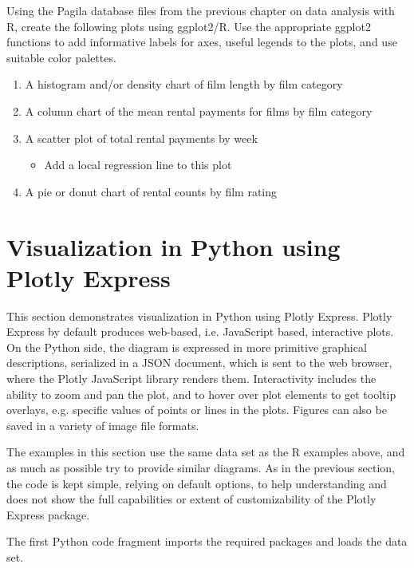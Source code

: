 \begin{exercisebox}
Using the Pagila database files from the previous chapter on data analysis with R, create the following plots using ggplot2/R. Use the appropriate ggplot2 functions to add informative labels for axes, useful legends to the plots, and use suitable color palettes. 

\begin{enumerate}
   \item A histogram and/or density chart of film length by film category
   \item A column chart of the mean rental payments for films by film category
   \item A scatter plot of total rental payments by week
   \begin{itemize}
      \item Add a local regression line to this plot
   \end{itemize}
   \item A pie or donut chart of rental counts by film rating
\end{enumerate}
\end{exercisebox}

\FloatBarrier

\section{Visualization in Python using Plotly Express}

This section demonstrates visualization in Python using Plotly Express. Plotly Express by default produces web-based, i.e. JavaScript based, interactive plots. On the Python side, the diagram is expressed in more primitive graphical descriptions, serialized in a JSON document, which is sent to the web browser, where the Plotly JavaScript library renders them. Interactivity includes the ability to zoom and pan the plot, and to hover over plot elements to get tooltip overlays, e.g. specific values of points or lines in the plots. Figures can also be saved in a variety of image file formats.

The examples in this section use the same data set as the R examples above, and as much as possible try to provide similar diagrams. As in the previous section, the code is kept simple, relying on default options, to help understanding and does not show the full capabilities or extent of customizability of the Plotly Express package. 

The first Python code fragment imports the required packages and loads the data set. 

